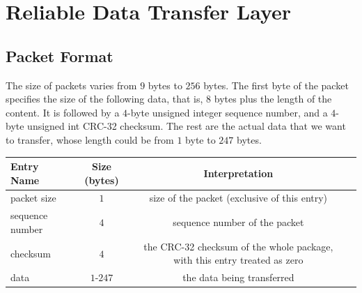 \documentclass[10pt,a4paper]{article}
\begin{document}
\section{Reliable Data Transfer Layer}
\subsection{Packet Format}
    The size of packets varies from $9$ bytes to $256$ bytes. The first byte of the packet specifies the size of the following data, that is, $8$ bytes plus the length of the content. It is followed by a $4$-byte unsigned integer sequence number, and a $4$-byte unsigned int CRC-32 checksum. The rest are the actual data that we want to transfer, whose length could be from $1$ byte to $247$ bytes.

\begin{center}
    \begin{tabular}{lccc}
        Entry Name & Size (bytes) & Interpretation \\%
            \hline
        packet size & $1$ &  size of the packet (exclusive of this entry)\\ 
        sequence number & $4$ & sequence number of the packet\\
        checksum & $4$ & the CRC-32 checksum of the whole package, with this entry treated as zero\\
        data & $1$-$247$ & the data being transferred\\
    \end{tabular}
\end{center}

    
\end{document}
